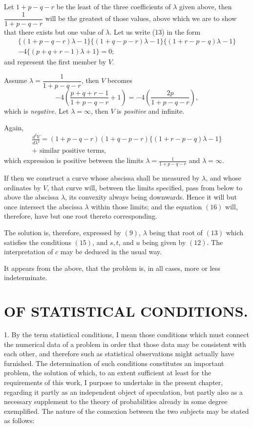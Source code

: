 \documentclass[oneside]{book}
\begin{document}
Let $1+p-q-r$ be the least of the three coefficients of $\lambda$
given above, then $\dfrac{1}{1+p-q-r}$ will be the greatest of those values,
above which we are to show that there exists but one value
of $\lambda$. Let us write (13) in the form
\begin{gather*}
  \{(1+p-q-r)\lambda - 1\}
  \{(1+q-p-r)\lambda - 1\}
  \{(1+r-p-q)\lambda - 1\}   \\
-4\{(p+q+r-1)\lambda + 1\} = 0;   \tag{16}
\end{gather*}
and represent the first member by $V$.

Assume $\lambda = \dfrac{1}{1+p-q-r}$, then $V$ becomes
\[
  -4\left(\frac{p+q+r-1}{1+p-q-r} + 1\right)
= -4\left(\frac{2p}{1+p-q-r} \right),
\]
which is \emph{negative.}
Let $\lambda = \infty$, then $V$ is \emph{positive} and infinite.

Again,
\begin{multline*}
\frac{d^2V}{d\lambda^2}
= (1 + p - q - r)(1 + q - p - r)\{(1 + r - p - q)\lambda - 1\}   \\
+ \text{ similar positive terms},
\end{multline*}
which expression is positive between the limits
$\lambda = \frac{1}{1 + p - q - r}$ and $\lambda = \infty$.

If then we construct a curve whose abscissa shall be measured
by $\lambda$, and whose ordinates by $V$, that curve will, between the
limits specified, pass from below to above the abscissa $\lambda$, its convexity
always being downwards. Hence it will but once intersect
the abscissa $\lambda$ within those limits; and the equation $(16)$ will, therefore,
have but one root thereto corresponding.

The solution is, therefore, expressed by $(9)$, $\lambda$ being that
root of $(13)$ which satisfies the conditions $(15)$, and $s, t$, and $u$
being given by $(12)$. The interpretation of $c$ may be deduced
in the usual way.

It appears from the above, that the problem is, in all cases,
more or less indeterminate.

\chapter[OF STATISTICAL CONDITIONS.]{\large OF STATISTICAL CONDITIONS.}
1. By the term statistical conditions, I mean those conditions
which must connect the numerical data of a problem in
order that those data may be consistent with each other, and
therefore such as statistical observations might actually have
furnished. The determination of such conditions constitutes an
important problem, the solution of which, to an extent sufficient
at least for the requirements of this work, I purpose to undertake
in the present chapter, regarding it partly as an independent object
of speculation, but partly also as a necessary supplement to
the theory of probabilities already in some degree exemplified.
The nature of the connexion between the two subjects may be
stated as follows:
\end{document}
